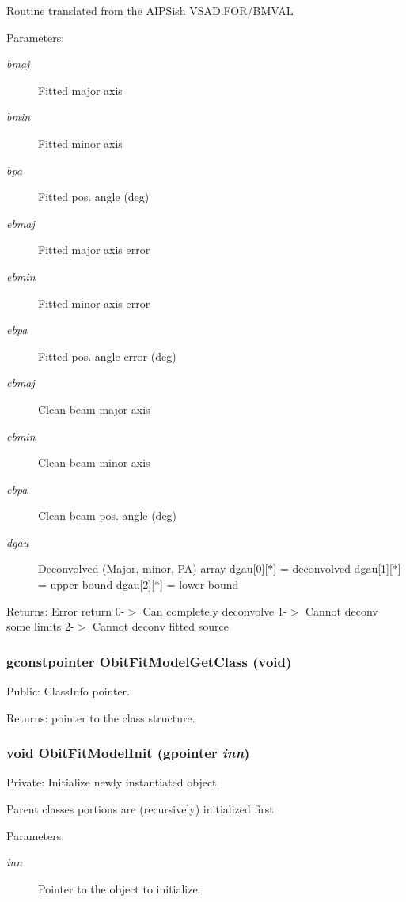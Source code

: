 Routine translated from the AIPSish VSAD.FOR/BMVAL \begin{Desc}
\item[Parameters:]
\begin{description}
\item[{\em bmaj}]Fitted major axis \item[{\em bmin}]Fitted minor axis \item[{\em bpa}]Fitted pos. angle (deg) \item[{\em ebmaj}]Fitted major axis error \item[{\em ebmin}]Fitted minor axis error \item[{\em ebpa}]Fitted pos. angle error (deg) \item[{\em cbmaj}]Clean beam major axis \item[{\em cbmin}]Clean beam minor axis \item[{\em cbpa}]Clean beam pos. angle (deg) \item[{\em dgau}]Deconvolved (Major, minor, PA) array dgau[0][$\ast$] = deconvolved dgau[1][$\ast$] = upper bound dgau[2][$\ast$] = lower bound \end{description}
\end{Desc}
\begin{Desc}
\item[Returns:]Error return 0-$>$ Can completely deconvolve 1-$>$ Cannot deconv some limits 2-$>$ Cannot deconv fitted source \end{Desc}
\subsubsection{\setlength{\rightskip}{0pt plus 5cm}gconstpointer Obit\-Fit\-Model\-Get\-Class (void)}\label{ObitFitModel_8c_a8}


Public: Class\-Info pointer. 

\begin{Desc}
\item[Returns:]pointer to the class structure. \end{Desc}
\subsubsection{\setlength{\rightskip}{0pt plus 5cm}void Obit\-Fit\-Model\-Init (gpointer {\em inn})}\label{ObitFitModel_8c_a3}


Private: Initialize newly instantiated object. 

Parent classes portions are (recursively) initialized first \begin{Desc}
\item[Parameters:]
\begin{description}
\item[{\em inn}]Pointer to the object to initialize. \end{description}
\end{Desc}
